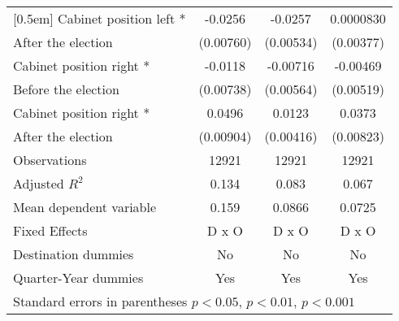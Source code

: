 \begin{table}[!ht]
\begin{tabular}{l*{3}{c}}
[0.5em]
Cabinet position left * &     -0.0256\sym{**} &     -0.0257\sym{***}&   0.0000830         \\
 After the election                   &   (0.00760)         &   (0.00534)         &   (0.00377)         \\
[0.5em]
Cabinet position right * &     -0.0118         &    -0.00716         &    -0.00469         \\
 Before the election                   &   (0.00738)         &   (0.00564)         &   (0.00519)         \\
[0.5em]
Cabinet position right * &      0.0496\sym{***}&      0.0123\sym{**} &      0.0373\sym{***}\\
After the election                    &   (0.00904)         &   (0.00416)         &   (0.00823)         \\
\hline
Observations        &       12921         &       12921         &       12921         \\
Adjusted \(R^{2}\)  &       0.134         &       0.083         &       0.067         \\
Mean dependent variable&       0.159         &      0.0866         &      0.0725         \\
Fixed Effects       &       D x O         &       D x O         &       D x O         \\
Destination dummies &          No         &          No         &          No         \\
Quarter-Year dummies&         Yes         &         Yes         &         Yes         \\
\hline\hline
\multicolumn{4}{l}{Standard errors in parentheses \sym{*} \(p<0.05\), \sym{**} \(p<0.01\), \sym{***} \(p<0.001\)}\\
\end{tabular}
\end{table}
